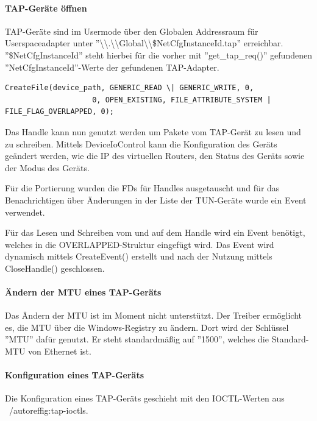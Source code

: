 {\paragraph{TAP-Geräte öffnen}
TAP-Geräte sind im Usermode über den Globalen Addressraum für Userspaceadapter
unter ''\textbackslash{}\textbackslash{}.\textbackslash{}\textbackslash{}Global\textbackslash{}\textbackslash{}\$NetCfgInstanceId.tap'' erreichbar.
''\$NetCfgInstanceId'' steht hierbei für die vorher mit ''get\_tap\_req()'' gefundenen
''NetCfgInstanceId''-Werte der gefundenen TAP-Adapter.

\begin{lstlisting}[numbers=none]
CreateFile(device_path, GENERIC_READ \| GENERIC_WRITE, 0,
                    0, OPEN_EXISTING, FILE_ATTRIBUTE_SYSTEM | FILE_FLAG_OVERLAPPED, 0);
\end{lstlisting}

Das Handle kann nun genutzt werden um Pakete vom TAP-Gerät zu lesen und zu schreiben.
Mittels DeviceIoControl kann die Konfiguration des Geräts geändert werden,
wie die IP des virtuellen Routers, den Status des Geräts sowie der Modus des Geräts.

Für die Portierung wurden die \acp{FD} für Handles ausgetauscht und für das Benachrichtigen
über Änderungen in der Liste der TUN-Geräte wurde ein Event verwendet.

Für das Lesen und Schreiben vom und auf dem Handle wird ein Event benötigt,
welches in die OVERLAPPED-Struktur eingefügt wird. Das Event wird dynamisch mittels CreateEvent()
erstellt und nach der Nutzung mittels CloseHandle() geschlossen.

\paragraph{Ändern der MTU eines TAP-Geräts}
Das Ändern der \ac{MTU} ist im Moment nicht unterstützt. Der Treiber ermöglicht es,
die \ac{MTU} über die Windows-Registry zu ändern. Dort wird der Schlüssel ''MTU''
dafür genutzt. Er steht standardmäßig auf ''1500'', welches die Standard-\ac{MTU}
von Ethernet ist.
\paragraph{Konfiguration eines TAP-Geräts}
Die Konfiguration eines TAP-Geräts geschieht mit den IOCTL-Werten aus ~/autoref{fig:tap-ioctls}.

}
